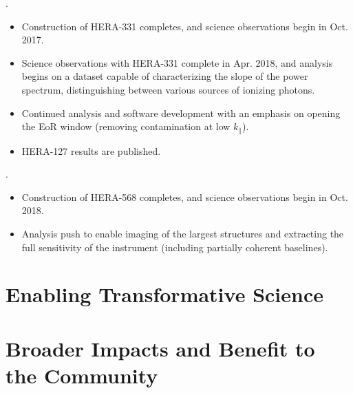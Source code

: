 \documentclass[preprint]{aastex}
\begin{document}
.
\begin{itemize}
\setlength{\parskip}{0pt}
\vspace{-7pt}
  \item Construction of HERA-331 completes, and science observations begin in Oct. 2017.
  \item Science observations with HERA-331 complete in Apr. 2018, and analysis begins on a dataset capable of
characterizing the slope of the power spectrum, distinguishing between various
sources of ionizing photons.
  \item Continued analysis and software development with an emphasis on opening the EoR window (removing contamination at low $k_{\parallel}$). 
  \item  HERA-127 results are published.
\end{itemize}

.
\begin{itemize}
\setlength{\parskip}{0pt}
\vspace{-7pt}
  \item Construction of HERA-568 completes, and science observations begin in Oct. 2018.
  \item Analysis push to enable imaging of the largest structures and extracting the full sensitivity of the instrument (including partially coherent baselines). 
\end{itemize}




\section{Enabling Transformative Science}


\section{Broader Impacts and Benefit to the Community}
\label{BIsec}
\end{document}
